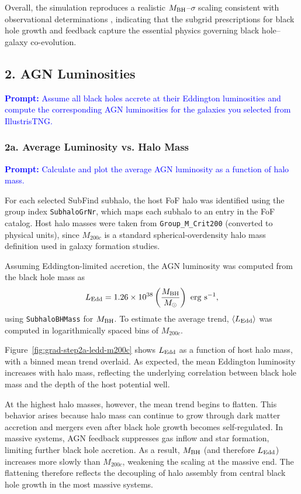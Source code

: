 \documentclass[twocolumn]{aastex631}
\begin{document}
Overall, the simulation reproduces a realistic $M_{\rm BH}$--$\sigma$ scaling consistent with observational determinations \citep{Tremaine2002Msigma,KormendyHo2013}, indicating that the
subgrid prescriptions for black hole growth and feedback capture the essential physics governing
black hole--galaxy co-evolution.

\subsection{2. AGN Luminosities}
\textcolor{blue}{\textbf{Prompt:} Assume all black holes accrete at their Eddington luminosities and compute the corresponding AGN luminosities for the galaxies you selected from IllustrisTNG.}

\subsubsection{2a. Average Luminosity vs. Halo Mass}

\textcolor{blue}{\textbf{Prompt:} Calculate and plot the average AGN luminosity as a function of halo mass.}

For each selected SubFind subhalo, the host FoF halo was identified using the group index
\texttt{SubhaloGrNr}, which maps each subhalo to an entry in the FoF catalog. Host halo masses were
taken from \texttt{Group\_M\_Crit200} (converted to physical units), since \(M_{200c}\) is a standard
spherical-overdensity halo mass definition used in galaxy formation studies.

Assuming Eddington-limited accretion, the AGN luminosity was computed from the black hole mass as
\begin{equation}
L_{\rm Edd} = 1.26 \times 10^{38}\left(\frac{M_{\rm BH}}{M_\odot}\right)\ \mathrm{erg\ s^{-1}},
\end{equation}
using \texttt{SubhaloBHMass} for \(M_{\rm BH}\). To estimate the average trend,
\(\langle L_{\rm Edd}\rangle\) was computed in logarithmically spaced bins of \(M_{200c}\).

Figure~\ref{fig:grad-step2a-ledd-m200c} shows \(L_{\rm Edd}\) as a function of host halo mass, with a
binned mean trend overlaid. As expected, the mean Eddington luminosity increases with halo mass,
reflecting the underlying correlation between black hole mass and the depth of the host potential well.

At the highest halo masses, however, the mean trend begins to flatten. This behavior arises because
halo mass can continue to grow through dark matter accretion and mergers even after black hole growth
becomes self-regulated. In massive systems, AGN feedback suppresses gas inflow and star formation,
limiting further black hole accretion. As a result, \(M_{\rm BH}\) (and therefore \(L_{\rm Edd}\))
increases more slowly than \(M_{200c}\), weakening the scaling at the massive end. The flattening
therefore reflects the decoupling of halo assembly from central black hole growth in the most massive
systems.
\end{document}
